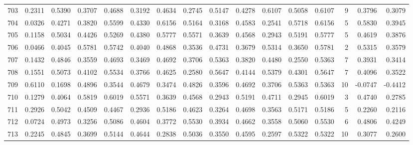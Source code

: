 \begin{tabular}{lrrrrrrrrrrrrrrr}
703 &      0.2311 &  0.5390 &  0.3707 &  0.4688 &  0.3192 &  0.4634 &  0.2745 &  0.5147 &  0.4278 &  0.6107 &   0.5058 &     0.6107 &      9 &                    0.3796 &                     0.3079 \\
704 &      0.0326 &  0.4271 &  0.3820 &  0.5599 &  0.4330 &  0.6156 &  0.5164 &  0.3168 &  0.4583 &  0.2541 &   0.5718 &     0.6156 &      5 &                    0.5830 &                     0.3945 \\
705 &      0.1158 &  0.5034 &  0.4426 &  0.5269 &  0.4380 &  0.5777 &  0.5571 &  0.3639 &  0.4568 &  0.2943 &   0.5191 &     0.5777 &      5 &                    0.4619 &                     0.3876 \\
706 &      0.0466 &  0.4045 &  0.5781 &  0.5742 &  0.4040 &  0.4868 &  0.3536 &  0.4731 &  0.3679 &  0.5314 &   0.3650 &     0.5781 &      2 &                    0.5315 &                     0.3579 \\
707 &      0.1432 &  0.4846 &  0.3559 &  0.4693 &  0.3469 &  0.4692 &  0.3706 &  0.5363 &  0.3820 &  0.4480 &   0.2550 &     0.5363 &      7 &                    0.3931 &                     0.3414 \\
708 &      0.1551 &  0.5073 &  0.4102 &  0.5534 &  0.3766 &  0.4625 &  0.2580 &  0.5647 &  0.4144 &  0.5379 &   0.4301 &     0.5647 &      7 &                    0.4096 &                     0.3522 \\
709 &      0.6110 &  0.1698 &  0.4896 &  0.3544 &  0.4679 &  0.3474 &  0.4826 &  0.3596 &  0.4692 &  0.3706 &   0.5363 &     0.5363 &     10 &                   -0.0747 &                    -0.4412 \\
710 &      0.1279 &  0.4064 &  0.5819 &  0.6019 &  0.5571 &  0.3639 &  0.4568 &  0.2943 &  0.5191 &  0.4711 &   0.2945 &     0.6019 &      3 &                    0.4740 &                     0.2785 \\
711 &      0.2926 &  0.5042 &  0.4509 &  0.4467 &  0.2936 &  0.5186 &  0.4623 &  0.3264 &  0.4698 &  0.3563 &   0.5171 &     0.5186 &      5 &                    0.2260 &                     0.2116 \\
712 &      0.0724 &  0.4973 &  0.3256 &  0.5086 &  0.4604 &  0.3772 &  0.5530 &  0.3934 &  0.4662 &  0.3558 &   0.5060 &     0.5530 &      6 &                    0.4806 &                     0.4249 \\
713 &      0.2245 &  0.4845 &  0.3699 &  0.5144 &  0.4644 &  0.2838 &  0.5036 &  0.3550 &  0.4595 &  0.2597 &   0.5322 &     0.5322 &     10 &                    0.3077 &                     0.2600 \\

\end{tabular}

